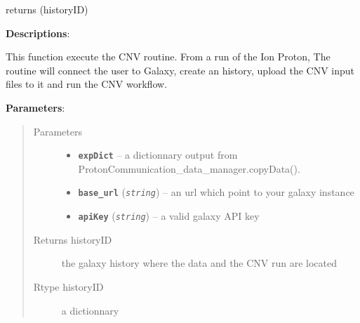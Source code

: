 \documentclass[letterpaper,10pt,english]{sphinxmanual}
\begin{document}
\begin{fulllineitems}
\label{datamanagerpkg:datamanagerpkg.GalaxyCommunication_data_manager.mainCNV}
returns (historyID)

\textbf{Descriptions}:

This function execute the CNV routine. From a run of the Ion Proton,
The routine will connect the user to Galaxy, create an history,
upload the CNV input files to it and run the CNV workflow.

\textbf{Parameters}:
\begin{quote}\begin{description}
\item[{Parameters}] \leavevmode\begin{itemize}
\item {} 
\textbf{\texttt{expDict}} -- a dictionnary output from ProtonCommunication\_data\_manager.copyData().

\item {} 
\textbf{\texttt{base\_url}} (\emph{\texttt{string}}) -- an url which point to your galaxy instance

\item {} 
\textbf{\texttt{apiKey}} (\emph{\texttt{string}}) -- a valid galaxy API key

\end{itemize}

\item[{Returns historyID}] \leavevmode
the galaxy history where the data and the CNV run are located

\item[{Rtype historyID}] \leavevmode
a dictionnary

\end{description}\end{quote}

\end{fulllineitems}

\end{document}
